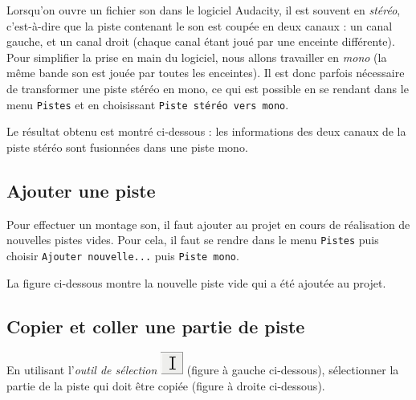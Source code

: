 Lorsqu'on ouvre un fichier son dans le logiciel Audacity, il est souvent en \emph{stéréo}, c'est-à-dire que la piste contenant le son est coupée en deux canaux : un canal gauche, et un canal droit (chaque canal étant joué par une enceinte différente). Pour simplifier la prise en main du logiciel, nous allons travailler en \emph{mono} (la même bande son est jouée par toutes les enceintes). Il est donc parfois nécessaire de transformer une piste stéréo en mono, ce qui est possible en se rendant dans le menu \texttt{Pistes} et en choisissant \texttt{Piste stéréo vers mono}.    


Le résultat obtenu est montré ci-dessous : les informations des deux canaux de la piste stéréo sont fusionnées dans une piste mono.





\subsection{Ajouter une piste}\label{Son1ajouterPiste}

Pour effectuer un montage son, il faut ajouter au projet en cours de réalisation de nouvelles pistes vides. Pour cela, il faut se rendre dans le menu \texttt{Pistes} puis choisir \texttt{Ajouter nouvelle...} puis \texttt{Piste mono}.   


La figure ci-dessous montre la nouvelle piste vide qui a été ajoutée au projet.






\subsection{Copier et coller une partie de piste}\label{Son1copierColler} 

En utilisant l'\emph{outil de sélection} \includegraphics[width=.5cm]{./images/son01/audacityIconeSelection} (figure à gauche ci-dessous), sélectionner la partie de la piste qui doit être copiée (figure à droite ci-dessous).

